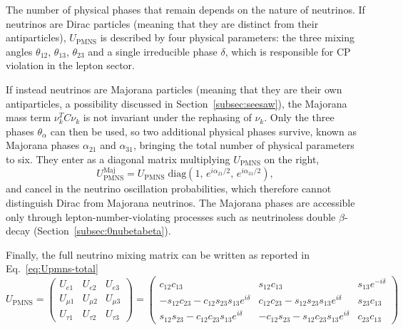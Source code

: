 The number of physical phases that remain depends on the nature of neutrinos. If neutrinos are Dirac particles (meaning that they are distinct from their antiparticles), $U_\text{PMNS}$ is described by four physical parameters: the three mixing angles $\theta_{12}$, $\theta_{13}$, $\theta_{23}$ and a single irreducible phase $\delta$, which is responsible for \ac{CP} violation in the lepton sector.

If instead neutrinos are Majorana particles (meaning that they are their own antiparticles, a possibility discussed in Section~\ref{subsec:seesaw}), the Majorana mass term $\nu_k^T C \nu_k$ is not invariant under the rephasing of $\nu_k$. Only the three phases $\theta_\alpha$ can then be used, so two additional physical phases survive, known as Majorana phases $\alpha_{21}$ and $\alpha_{31}$, bringing the total number of physical parameters to six. They enter as a diagonal matrix multiplying $U_\text{PMNS}$ on the right,
\begin{equation}
    \label{eq:Upmns-majorana}
    U_\text{PMNS}^\text{Maj} = U_\text{PMNS}\;\text{diag}\left(1,\, e^{i\alpha_{21}/2},\, e^{i\alpha_{31}/2}\right),
\end{equation}
and cancel in the neutrino oscillation probabilities, which therefore cannot distinguish Dirac from Majorana neutrinos. The Majorana phases are accessible only through lepton-number-violating processes such as neutrinoless double $\beta$-decay (Section~\ref{subsec:0nubetabeta}).

Finally, the full neutrino mixing matrix can be written as reported in Eq.~\ref{eq:Upmns-total}
\begin{equation}
    \label{eq:Upmns-total}
    U_{\text{PMNS}} = 
    \begin{pmatrix}
    U_{e1} & U_{e2} & U_{e3} \\
    U_{\mu 1} & U_{\mu 2} & U_{\mu 3} \\
    U_{\tau 1} & U_{\tau 2} & U_{\tau 3}
    \end{pmatrix}
    =
    \begin{pmatrix}
    c_{12}c_{13} & s_{12}c_{13} & s_{13}e^{-i\delta} \\[1ex]
    -s_{12}c_{23} - c_{12}s_{23}s_{13}e^{i\delta} & c_{12}c_{23} - s_{12}s_{23}s_{13}e^{i\delta} & s_{23}c_{13} \\[1ex]
    s_{12}s_{23} - c_{12}c_{23}s_{13}e^{i\delta} & -c_{12}s_{23} - s_{12}c_{23}s_{13}e^{i\delta} & c_{23}c_{13}
    \end{pmatrix}
\end{equation}

